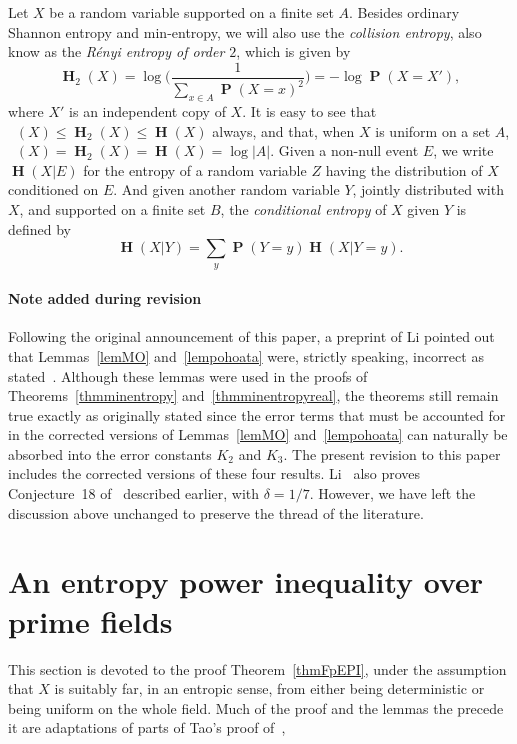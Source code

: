 \documentclass[twoside, 10pt]{article}
\DeclareMathOperator{\Eta}{\mathbf{H}}
\DeclareMathOperator{\Etamin}{\mathbf{H}_\infty}
\DeclareMathOperator{\pr}{\mathbf{P}}
\begin{document}
Let $X$ be a random variable supported on a finite set $A$.
Besides ordinary Shannon entropy and min-entropy, we will
also use the \textit{collision entropy}, also know as the 
\textit{R\'enyi entropy of order $2$}, which is given by
$$\Eta_2(X) = \log \Biggl( \frac{1}{\sum_{x\in A}\pr(X = x)^2}\Biggr) 
= -\log \pr(X = X'),$$
where $X'$ is an independent copy of $X$.
It is easy to see that $\Etamin(X) \le \Eta_2(X) \le \Eta(X)$
always, and that, 
when $X$ is uniform on a set $A$, 
$\Etamin(X)= \Eta_2(X) = \Eta(X)=\log|A|$.
Given a non-null event $E$, we write $\Eta(X|E)$ for the
entropy of a random variable $Z$ having the distribution
of $X$ conditioned on $E$. And given 
another random variable $Y$, jointly distributed
with $X$, and supported on a finite set $B$,
the {\em conditional entropy}
of $X$ given $Y$ is defined by
$$\Eta(X|Y)=\sum_y \pr(Y=y)\Eta(X|Y=y).$$

\paragraph{Note added during revision}
Following the original announcement of this paper, a preprint of Li pointed out that Lemmas~\ref{lemMO} and~\ref{lempohoata} were, strictly speaking, incorrect as stated~\cite[Remark 6.3]{li2026}. Although these lemmas were used in the proofs of Theorems~\ref{thmminentropy} and~\ref{thmminentropyreal}, the theorems still remain true exactly as originally stated since the error terms that must be accounted for in the corrected versions of Lemmas~\ref{lemMO} and~\ref{lempohoata} can naturally be absorbed into the error constants $K_2$ and $K_3$. The present revision to this paper includes the corrected versions of these four results.
Li~\cite{li2026} also proves Conjecture~18 of~\cite{goh2024} described earlier, with $\delta=1/7$. However, we have left the discussion above unchanged to preserve the thread of the literature.

\section{An entropy power inequality over prime fields}

This section is devoted to the proof Theorem~\ref{thmFpEPI}, 
under the assumption that $X$ is suitably far, in an entropic sense, 
from either being deterministic or being uniform on the whole field. 
Much of the proof and the lemmas the precede it are 
adaptations of parts of Tao's proof of~\cite[Theorem~1.9]{tao2010},
\end{document}
